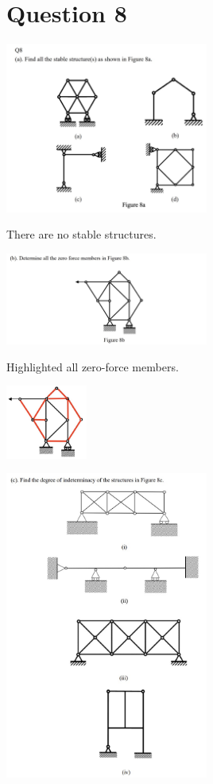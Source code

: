 \documentclass{article}
\begin{document}
\section*{Question 8}
\begin{center}
    \includegraphics[width=0.5\textwidth]{img/2-4.jpg}
\end{center}
There are no stable structures.

\begin{center}
    \includegraphics[width=0.5\textwidth]{img/2-5.jpg}

\end{center}
Highlighted all zero-force members.

\includegraphics[width=0.2\textwidth]{img/2-8b.jpg}

\begin{center}
    \includegraphics[width=0.5\textwidth]{img/2-6.jpg}
\end{center}
\end{document}
